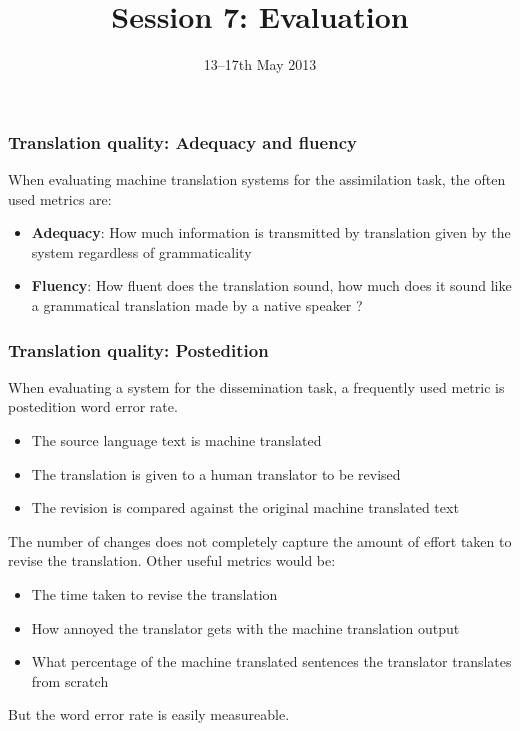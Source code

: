 \documentclass[10pt,xetex]{beamer} %
\date{13--17th May 2013}
\title{Session 7: Evaluation}
\begin{document}
\begin{frame}
        \titlepage
\MyLogoBottomCentred
\end{frame}



\begin{frame}
  \frametitle{Translation quality: Adequacy and fluency}

When evaluating machine translation systems for the assimilation task, the often used 
metrics are:

\begin{itemize}
  \item {\bf Adequacy}: How much information is transmitted by translation given by the system
   regardless of grammaticality
  \item {\bf Fluency}: How fluent does the translation sound, how much does it sound like 
   a grammatical translation made by a native speaker ?
\end{itemize}

\end{frame}

\begin{frame}
  \frametitle{Translation quality: Postedition} %

When evaluating a system for the dissemination task, a frequently used metric is 
postedition word error rate.

\begin{itemize}

  \item The source language text is machine translated
  \item The translation is given to a human translator to be revised
  \item The revision is compared against the original machine translated text
\end{itemize}

The number of changes does not completely capture the amount of effort taken to revise
the translation. Other useful metrics would be:

\begin{itemize}

  \item The time taken to revise the translation
  \item How annoyed the translator gets with the machine translation output
  \item What percentage of the machine translated sentences the translator
    translates from scratch
\end{itemize}

But the word error rate is easily measureable.

\end{frame}
\end{document}
